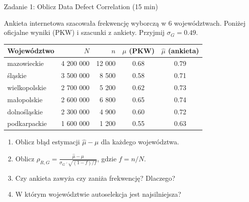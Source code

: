\documentclass[10pt,ignorenonframetext, aspectratio=169]{beamer}
\begin{document}
\begin{frame}{Zadanie 1: Oblicz Data Defect Correlation (15 min)}

Ankieta internetowa szacowała frekwencję wyborczą w 6 województwach. Poniżej oficjalne wyniki (PKW) i szacunki z ankiety. Przyjmij $\sigma_G = 0.49$.

\begin{table}
    \centering
    \small
    \begin{tabular}{lrrcc}
    \hline
    Województwo & $N$ & $n$ & $\mu$ (PKW) & $\hat{\mu}$ (ankieta) \\
    \hline
    mazowieckie   & 4 200 000 & 12 000 & 0.68 & 0.79 \\
    śląskie       & 3 500 000 &  8 500 & 0.58 & 0.71 \\
    wielkopolskie & 2 700 000 &  5 200 & 0.62 & 0.73 \\
    małopolskie   & 2 600 000 &  6 800 & 0.65 & 0.74 \\
    dolnośląskie  & 2 300 000 &  4 900 & 0.60 & 0.72 \\
    podkarpackie  & 1 600 000 &  1 200 & 0.55 & 0.63 \\
    \hline
    \end{tabular}
\end{table}

\begin{enumerate}
    \item Oblicz błąd estymacji $\hat{\mu} - \mu$ dla każdego województwa.
    \item Oblicz $\rho_{R,G} = \frac{\hat{\mu} - \mu}{\sigma_G \cdot \sqrt{(1-f)/f}}$, gdzie $f = n/N$.
    \item Czy ankieta zawyża czy zaniża frekwencję? Dlaczego?
    \item W którym województwie autoselekcja jest najsilniejsza?
\end{enumerate}

\end{frame}
\end{document}
